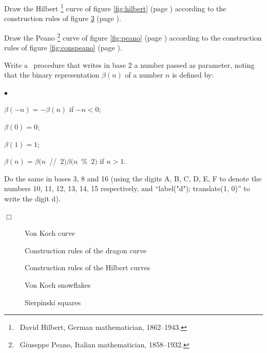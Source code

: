 \begin{exercice}
{\tiret Draw the Hilbert\/%
\footnote{\ David Hilbert, German mathematician, 1862--1943.}
curve of figure \ref{fig:hilbert}  (page \pageref{fig:hilbert}) according to the construction rules of
figure \ref{fig:conshilbert}  (page \pageref{fig:conshilbert}).

\tiret Draw the Peano\/%
\footnote{\ Giuseppe Peano, Italian mathematician, 1858--1932.}
 curve of figure \ref{fig:peano}  (page \pageref{fig:peano}) according to the construction rules of
figure \ref{fig:conspeano}  (page \pageref{fig:conspeano}).

\tiret Write a \python\ procedure that writes in base 2 a number passed as parameter,
noting that the binary representation $\beta(n)$ of a number $n$ is defined by:
\begin{list}{$\scriptscriptstyle\bullet$}{
}
  \item $\beta(-n) = -\beta(n)$ if $-n < 0$;
  \item $\beta(0) = 0$;
 \item $\beta(1) = 1$;
 \item $\beta(n) = \beta(n $\ {\idt //}\ $ 2) \beta(n$\ {\idt \%}\ $2)$ if $n > 1$.
\end{list}
Do the same in bases 3, 8 and 16 (using the digits {\idt A}, {\idt B}, {\idt C}, {\idt D},
{\idt E}, {\idt F} to denote the numbers 10, 11, 12, 13, 14, 15 respectively, and
``{\idt label(}{\cha "d"}{\idt ); translate(1, 0)}''
to write the digit \mbox{\cha d}).

\noindent $\Box$}\end{exercice}
\begin{figure}[htbp]
 \caption{Von Koch curve}\label{fig:segvonkoch}
\end{figure}
\begin{figure}[htbp]
 \caption{Construction rules of the dragon curve}\label{fig:consdragon}
\end{figure}
\begin{figure}[htbp]
 \caption{Construction rules of the Hilbert curves}\label{fig:conshilbert}
\end{figure}
\begin{figure}[htbp]
 \caption{Von Koch snowflakes}\label{fig:flocvonkoch}
\end{figure}
\begin{figure}[htbp]
 \caption{Sierpinski squares}\label{fig:carsierp}
\end{figure}

